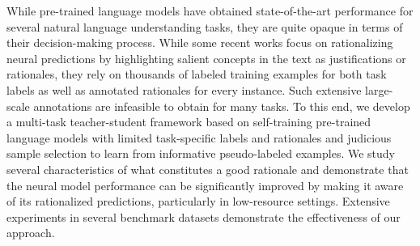 While pre-trained language models have obtained state-of-the-art performance for several natural language understanding tasks, they are quite opaque in terms of their decision-making process. While some recent works focus on rationalizing neural predictions by highlighting salient concepts in the text as justifications or rationales, they rely on thousands of labeled training examples for both task labels as well as annotated rationales for every instance. Such extensive large-scale annotations are infeasible to obtain for many tasks. To this end, we develop a multi-task teacher-student framework based on self-training pre-trained language models with limited task-specific labels and rationales and judicious sample selection to learn from informative pseudo-labeled examples. We study several characteristics of what constitutes a good rationale and demonstrate that the neural model performance can be significantly improved by making it aware of its rationalized predictions, particularly in low-resource settings. Extensive experiments in several benchmark datasets demonstrate the effectiveness of our approach.

